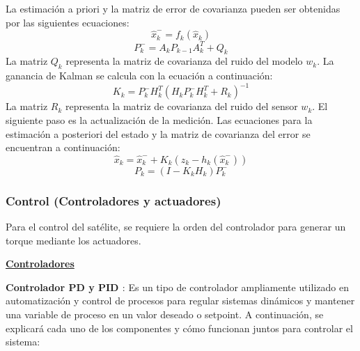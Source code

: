 La estimación a priori y la matriz de error de covarianza pueden ser obtenidas por las siguientes ecuaciones:
\[
\hat{x}_k^- = f_k(\hat{x}_k)
\]
\[
P_k^- = A_k P_{k-1} A_k^T + Q_k
\]
La matriz $Q_k$ representa la matriz de covarianza del ruido del modelo $w_k$. La ganancia de Kalman se calcula con la ecuación a continuación:
\[
K_k = P_k^- H_k^T \left( H_k P_k^- H_k^T + R_k \right)^{-1}
\]
La matriz $R_k$ representa la matriz de covarianza del ruido del sensor $w_k$. El siguiente paso es la actualización de la medición. Las ecuaciones para la estimación a posteriori del estado y la matriz de covarianza del error se encuentran a continuación:
\[
\hat{x}_k = \hat{x}_k^- + K_k \left( z_k - h_k(\hat{x}_k^-) \right)
\]
\[
P_k = \left( I - K_k H_k \right) P_k^-
\]

\subsubsection{Control (Controladores y actuadores)}

Para el control del satélite, se requiere la orden del controlador para generar un torque mediante los actuadores.

\textbf{\underline{Controladores}}

\textbf{Controlador \gls{PD} y \gls{PID} \cite{ref23}}: Es un tipo de controlador ampliamente utilizado en automatización y control de procesos para regular sistemas dinámicos y mantener una variable de proceso en un valor deseado o setpoint. A continuación, se explicará cada uno de los componentes y cómo funcionan juntos para controlar el sistema:

